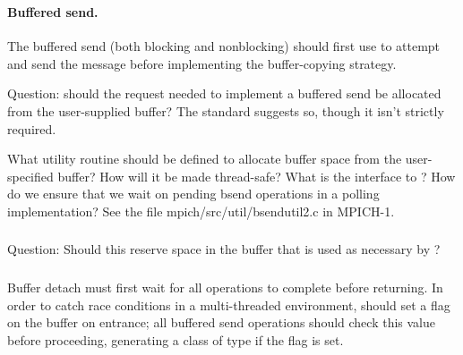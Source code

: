 \documentclass{article}
\begin{document}
\subsubsection{}
\begin{adi3}
\end{adi3}

\paragraph{Buffered send.}
The buffered send (both blocking and nonblocking) should first use
 to attempt 
and send the message before implementing the buffer-copying strategy.

Question: should the request needed to implement a buffered send be allocated
from the user-supplied buffer?  The standard suggests so, though it isn't
strictly required.

What utility routine should be defined to allocate buffer space from the
user-specified buffer?  How will it be made thread-safe?  What is the
interface to ?  How do we ensure that we wait on
pending bsend operations in a polling implementation?  See the file
mpich/src/util/bsendutil2.c in MPICH-1.

\subsubsection{}
\subsubsection{}
\subsubsection{}
Question:  Should this reserve space in the buffer that is used as
necessary by ?

\subsubsection{}
\subsubsection{}
Buffer detach must first wait for all operations to complete before
returning.  
In order to catch race conditions in a multi-threaded environment, 
 should set a flag on the buffer on entrance; all
buffered send operations should check this value before proceeding, generating
a  class of type  if the flag is
set.
\end{document}
